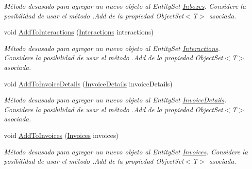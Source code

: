 \begin{DoxyCompactItemize}
\begin{DoxyCompactList}\small\item\em Método desusado para agregar un nuevo objeto al Entity\-Set \hyperlink{class_microsoft_1_1_samples_1_1_kinect_1_1_basic_interactions_1_1_inboxes}{Inboxes}. Considere la posibilidad de usar el método .Add de la propiedad Object\-Set$<$T$>$ asociada. \end{DoxyCompactList}\item 
void \hyperlink{class_microsoft_1_1_samples_1_1_kinect_1_1_basic_interactions_1_1_o_m_k_t_d_b_entities_a238e2fc836f7beb2e4ddc06cba378665}{Add\-To\-Interactions} (\hyperlink{class_microsoft_1_1_samples_1_1_kinect_1_1_basic_interactions_1_1_interactions}{Interactions} interactions)
\begin{DoxyCompactList}\small\item\em Método desusado para agregar un nuevo objeto al Entity\-Set \hyperlink{class_microsoft_1_1_samples_1_1_kinect_1_1_basic_interactions_1_1_interactions}{Interactions}. Considere la posibilidad de usar el método .Add de la propiedad Object\-Set$<$T$>$ asociada. \end{DoxyCompactList}\item 
void \hyperlink{class_microsoft_1_1_samples_1_1_kinect_1_1_basic_interactions_1_1_o_m_k_t_d_b_entities_a44db0cd8208062477404586d941535e1}{Add\-To\-Invoice\-Details} (\hyperlink{class_microsoft_1_1_samples_1_1_kinect_1_1_basic_interactions_1_1_invoice_details}{Invoice\-Details} invoice\-Details)
\begin{DoxyCompactList}\small\item\em Método desusado para agregar un nuevo objeto al Entity\-Set \hyperlink{class_microsoft_1_1_samples_1_1_kinect_1_1_basic_interactions_1_1_invoice_details}{Invoice\-Details}. Considere la posibilidad de usar el método .Add de la propiedad Object\-Set$<$T$>$ asociada. \end{DoxyCompactList}\item 
void \hyperlink{class_microsoft_1_1_samples_1_1_kinect_1_1_basic_interactions_1_1_o_m_k_t_d_b_entities_a42d8ba481101edd2b6ba68f396c9b7f5}{Add\-To\-Invoices} (\hyperlink{class_microsoft_1_1_samples_1_1_kinect_1_1_basic_interactions_1_1_invoices}{Invoices} invoices)
\begin{DoxyCompactList}\small\item\em Método desusado para agregar un nuevo objeto al Entity\-Set \hyperlink{class_microsoft_1_1_samples_1_1_kinect_1_1_basic_interactions_1_1_invoices}{Invoices}. Considere la posibilidad de usar el método .Add de la propiedad Object\-Set$<$T$>$ asociada. \end{DoxyCompactList}\item 

\end{DoxyCompactItemize}
